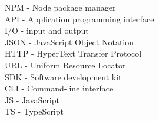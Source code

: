 NPM - Node package manager\\
API - Application programming interface\\
I/O - input and output\\
JSON - JavaScript Object Notation\\
HTTP - HyperText Transfer Protocol\\
URL - Uniform Resource Locator\\
SDK - Software development kit\\
CLI - Command-line interface\\
JS - JavaScript\\
TS - TypeScript\\